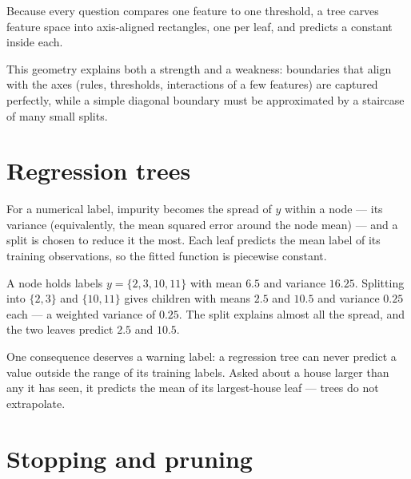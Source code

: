 Because every question compares one feature to one threshold, a tree carves feature space into axis-aligned rectangles, one per leaf, and predicts a constant inside each.

\begin{mlfigure}
\end{mlfigure}

This geometry explains both a strength and a weakness: boundaries that align with the axes (rules, thresholds, interactions of a few features) are captured perfectly, while a simple diagonal boundary must be approximated by a staircase of many small splits.

\section{Regression trees}

For a numerical label, impurity becomes the spread of $y$ within a node --- its variance (equivalently, the mean squared error around the node mean) --- and a split is chosen to reduce it the most. Each leaf predicts the mean label of its training observations, so the fitted function is piecewise constant.

\begin{workedexample}
A node holds labels $y=\{2,3,10,11\}$ with mean $6.5$ and variance $16.25$. Splitting into $\{2,3\}$ and $\{10,11\}$ gives children with means $2.5$ and $10.5$ and variance $0.25$ each --- a weighted variance of $0.25$. The split explains almost all the spread, and the two leaves predict $2.5$ and $10.5$.
\end{workedexample}

One consequence deserves a warning label: a regression tree can never predict a value outside the range of its training labels. Asked about a house larger than any it has seen, it predicts the mean of its largest-house leaf --- trees do not extrapolate.

\section{Stopping and pruning}

